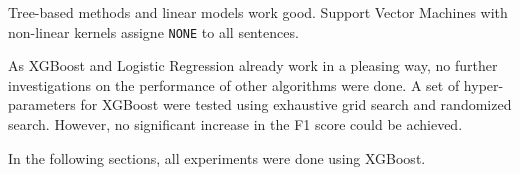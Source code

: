 %
%
%
%
%
%
%
%
%
%
%
%
%
%
%
%
%


Tree-based methods and linear models work good. Support Vector Machines with non-linear kernels assigne \texttt{NONE} to all sentences.

As XGBoost and Logistic Regression already work in a pleasing way, no further investigations on the performance of other algorithms were done. A set of hyper-parameters for XGBoost were tested using exhaustive grid search and randomized search. However, no significant increase in the F1 score could be achieved.

In the following sections, all experiments were done using XGBoost.


